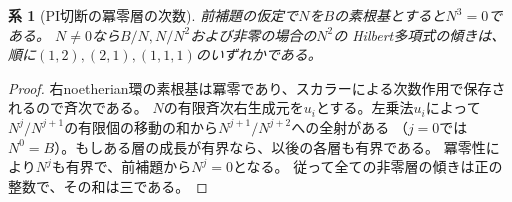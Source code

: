 \documentclass[11pt,a4paper]{ltjsarticle}
\newtheorem{corollary}[theorem]{系}
\theoremstyle{definition}
\begin{document}
\begin{corollary}[PI切断の冪零層の次数]
\label{cor:ou-pi-nilpotent-layers}
前補題の仮定で$N$を$B$の素根基とすると$N^3=0$である。
$N\ne0$なら$B/N,N/N^2$および非零の場合の$N^2$の
Hilbert多項式の傾きは、順に$(1,2),(2,1),(1,1,1)$のいずれかである。
\end{corollary}
\begin{proof}
右noetherian環の素根基は冪零であり、スカラーによる次数作用で保存されるので斉次である。
$N$の有限斉次右生成元を$u_i$とする。左乗法$u_i$によって
$N^j/N^{j+1}$の有限個の移動の和から$N^{j+1}/N^{j+2}$への全射がある
（$j=0$では$N^0=B$）。もしある層の成長が有界なら、以後の各層も有界である。
冪零性により$N^j$も有界で、前補題から$N^j=0$となる。
従って全ての非零層の傾きは正の整数で、その和は三である。
\end{proof}
\end{document}
